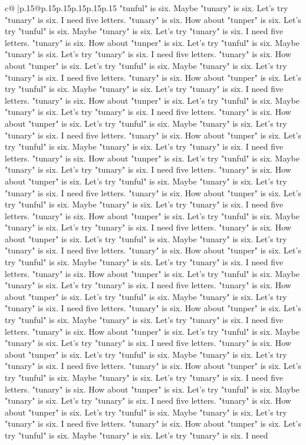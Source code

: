 \documentclass{article}
\begin{document}
{\begin{supertabular}{c@{$\;$}|p{.15\linewidth}@{}p{.15\linewidth}p{.15\linewidth}p{.15\linewidth}p{.15\linewidth}p{.15\linewidth}}
{{{"tunful" is six. Maybe "tunary" is six. Let's try "tunary" is six. I need five letters. "tunary" is six. How about "tunper" is six. Let's try "tunful" is six. Maybe "tunary" is six. Let's try "tunary" is six. I need five letters. "tunary" is six. How about "tunper" is six. Let's try "tunful" is six. Maybe "tunary" is six. Let's try "tunary" is six. I need five letters. "tunary" is six. How about "tunper" is six. Let's try "tunful" is six. Maybe "tunary" is six. Let's try "tunary" is six. I need five letters. "tunary" is six. How about "tunper" is six. Let's try "tunful" is six. Maybe "tunary" is six. Let's try "tunary" is six. I need five letters. "tunary" is six. How about "tunper" is six. Let's try "tunful" is six. Maybe "tunary" is six. Let's try "tunary" is six. I need five letters. "tunary" is six. How about "tunper" is six. Let's try "tunful" is six. Maybe "tunary" is six. Let's try "tunary" is six. I need five letters. "tunary" is six. How about "tunper" is six. Let's try "tunful" is six. Maybe "tunary" is six. Let's try "tunary" is six. I need five letters. "tunary" is six. How about "tunper" is six. Let's try "tunful" is six. Maybe "tunary" is six. Let's try "tunary" is six. I need five letters. "tunary" is six. How about "tunper" is six. Let's try "tunful" is six. Maybe "tunary" is six. Let's try "tunary" is six. I need five letters. "tunary" is six. How about "tunper" is six. Let's try "tunful" is six. Maybe "tunary" is six. Let's try "tunary" is six. I need five letters. "tunary" is six. How about "tunper" is six. Let's try "tunful" is six. Maybe "tunary" is six. Let's try "tunary" is six. I need five letters. "tunary" is six. How about "tunper" is six. Let's try "tunful" is six. Maybe "tunary" is six. Let's try "tunary" is six. I need five letters. "tunary" is six. How about "tunper" is six. Let's try "tunful" is six. Maybe "tunary" is six. Let's try "tunary" is six. I need five letters. "tunary" is six. How about "tunper" is six. Let's try "tunful" is six. Maybe "tunary" is six. Let's try "tunary" is six. I need five letters. "tunary" is six. How about "tunper" is six. Let's try "tunful" is six. Maybe "tunary" is six. Let's try "tunary" is six. I need five letters. "tunary" is six. How about "tunper" is six. Let's try "tunful" is six. Maybe "tunary" is six. Let's try "tunary" is six. I need five letters. "tunary" is six. How about "tunper" is six. Let's try "tunful" is six. Maybe "tunary" is six. Let's try "tunary" is six. I need five letters. "tunary" is six. How about "tunper" is six. Let's try "tunful" is six. Maybe "tunary" is six. Let's try "tunary" is six. I need five letters. "tunary" is six. How about "tunper" is six. Let's try "tunful" is six. Maybe "tunary" is six. Let's try "tunary" is six. I need five letters. "tunary" is six. How about "tunper" is six. Let's try "tunful" is six. Maybe "tunary" is six. Let's try "tunary" is six. I need five letters. "tunary" is six. How about "tunper" is six. Let's try "tunful" is six. Maybe "tunary" is six. Let's try "tunary" is six. I need five letters. "tunary" is six. How about "tunper" is six. Let's try "tunful" is six. Maybe "tunary" is six. Let's try "tunary" is six. I need }}}
\end{supertabular}}
\end{document}

